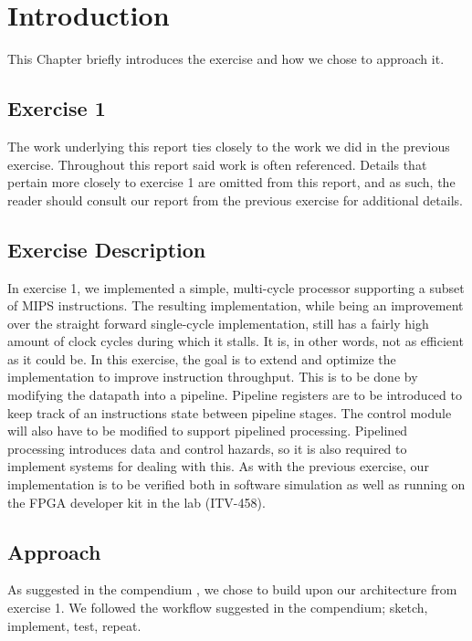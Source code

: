 \chapter{Introduction}
This Chapter briefly introduces the exercise and how we chose to approach it.

\section{Exercise 1}

The work underlying this report ties closely to the work we did in the previous exercise.
Throughout this report said work is often referenced.
Details that pertain more closely to exercise 1 are omitted from this report, and as such, the reader should consult our report from the previous exercise \cite{ex1report} for additional details.

\section{Exercise Description}

In exercise 1, we implemented a simple, multi-cycle processor supporting a subset of MIPS instructions.
The resulting implementation, while being an improvement over the straight forward single-cycle implementation, still has a fairly high amount of clock cycles during which it stalls.
It is, in other words, not as efficient as it could be.
In this exercise, the goal is to extend and optimize the implementation to improve instruction throughput.
This is to be done by modifying the datapath into a pipeline.
Pipeline registers are to be introduced to keep track of an instructions state between pipeline stages.
The control module will also have to be modified to support pipelined processing.
Pipelined processing introduces data and control hazards, so it is also required to implement systems for dealing with this.
As with the previous exercise, our implementation is to be verified both in software simulation as well as running on the FPGA developer kit in the lab (ITV-458).


\section{Approach}

As suggested in the compendium \cite{compendium}, we chose to build upon our architecture from exercise 1.
We followed the workflow suggested in the compendium; sketch, implement, test, repeat.
